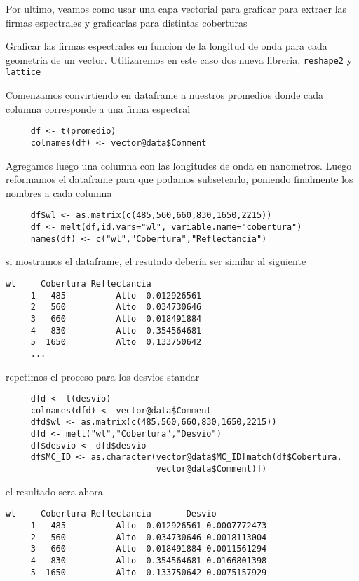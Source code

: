 Por ultimo, veamos como usar una capa vectorial para graficar para extraer las
firmas espectrales y graficarlas para distintas coberturas

\begin{exa}
     Graficar las firmas espectrales en funcion de la longitud de onda para cada
     geometria de un vector. Utilizaremos en este caso dos nueva libreria,
     \texttt{reshape2} y \texttt{lattice}

     Comenzamos convirtiendo en dataframe a nuestros promedios donde cada
     columna corresponde a una firma espectral
     \begin{lstlisting}
     df <- t(promedio)
     colnames(df) <- vector@data$Comment
     \end{lstlisting}
     Agregamos luego una columna con las longitudes de onda en nanometros. Luego
     reformamos el dataframe para que podamos subsetearlo, poniendo finalmente
     los nombres a cada columna
     \begin{lstlisting}
     df$wl <- as.matrix(c(485,560,660,830,1650,2215))
     df <- melt(df,id.vars="wl", variable.name="cobertura")
     names(df) <- c("wl","Cobertura","Reflectancia")
     \end{lstlisting}
     si mostramos el dataframe, el resutado debería ser similar al siguiente
     \begin{Verbatim}[fontsize=\small]
          wl     Cobertura Reflectancia
     1   485          Alto  0.012926561
     2   560          Alto  0.034730646
     3   660          Alto  0.018491884
     4   830          Alto  0.354564681
     5  1650          Alto  0.133750642
     ...
     \end{Verbatim}
     repetimos el proceso para los desvios standar
     \begin{lstlisting}
     dfd <- t(desvio)
     colnames(dfd) <- vector@data$Comment
     dfd$wl <- as.matrix(c(485,560,660,830,1650,2215))
     dfd <- melt("wl","Cobertura","Desvio")
     df$desvio <- dfd$desvio
     df$MC_ID <- as.character(vector@data$MC_ID[match(df$Cobertura,
                              vector@data$Comment)])
     \end{lstlisting}
     el resultado sera ahora
     \begin{Verbatim}[fontsize=\small]
         wl     Cobertura Reflectancia       Desvio
     1   485          Alto  0.012926561 0.0007772473
     2   560          Alto  0.034730646 0.0018113004
     3   660          Alto  0.018491884 0.0011561294
     4   830          Alto  0.354564681 0.0166801398
     5  1650          Alto  0.133750642 0.0075157929

\end{Verbatim}
\end{exa}
